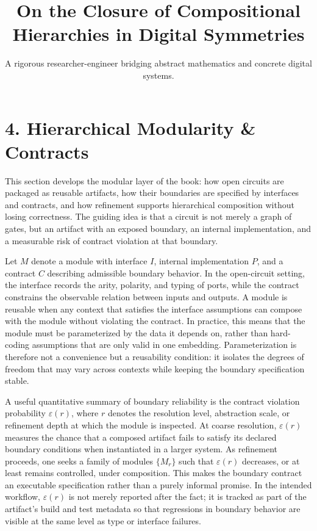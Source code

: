 \documentclass[11pt]{article}
\title{On the Closure of Compositional Hierarchies in Digital Symmetries}
\author{A rigorous researcher-engineer bridging abstract mathematics and concrete digital systems.}
\begin{document}
\section*{4. Hierarchical Modularity \& Contracts}

This section develops the modular layer of the book: how open circuits are packaged as reusable artifacts, how their boundaries are specified by interfaces and contracts, and how refinement supports hierarchical composition without losing correctness. The guiding idea is that a circuit is not merely a graph of gates, but an artifact with an exposed boundary, an internal implementation, and a measurable risk of contract violation at that boundary.

Let \(M\) denote a module with interface \(I\), internal implementation \(P\), and a contract \(C\) describing admissible boundary behavior. In the open-circuit setting, the interface records the arity, polarity, and typing of ports, while the contract constrains the observable relation between inputs and outputs. A module is reusable when any context that satisfies the interface assumptions can compose with the module without violating the contract. In practice, this means that the module must be parameterized by the data it depends on, rather than hard-coding assumptions that are only valid in one embedding. Parameterization is therefore not a convenience but a reusability condition: it isolates the degrees of freedom that may vary across contexts while keeping the boundary specification stable.

A useful quantitative summary of boundary reliability is the contract violation probability \(\varepsilon(r)\), where \(r\) denotes the resolution level, abstraction scale, or refinement depth at which the module is inspected. At coarse resolution, \(\varepsilon(r)\) measures the chance that a composed artifact fails to satisfy its declared boundary conditions when instantiated in a larger system. As refinement proceeds, one seeks a family of modules \(\{M_r\}\) such that \(\varepsilon(r)\) decreases, or at least remains controlled, under composition. This makes the boundary contract an executable specification rather than a purely informal promise. In the intended workflow, \(\varepsilon(r)\) is not merely reported after the fact; it is tracked as part of the artifact's build and test metadata so that regressions in boundary behavior are visible at the same level as type or interface failures.
\end{document}
